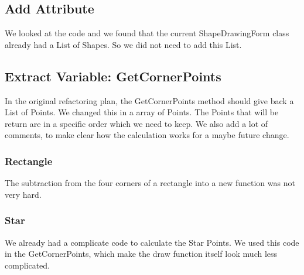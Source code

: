 \documentclass[a4paper,12pt]{article}
\begin{document}
\subsection{Add Attribute}
We looked at the code and we found that the current ShapeDrawingForm class already had a List of Shapes. So we did not need to add this List.

\subsection{Extract Variable: GetCornerPoints}
In the original refactoring plan, the GetCornerPoints method should give back a List of Points. We changed this in a array of Points. The Points that will be return are in a specific order which we need to keep. We also add a lot of comments, to make clear how the calculation works for a maybe future change.
\subsubsection{Rectangle}
The subtraction from the four corners of a rectangle into a new function was not very hard.

\subsubsection{Star}
We already had a complicate code to calculate the Star Points. We used this code in the GetCornerPoints, which make the draw function itself look much less complicated.
\end{document}
